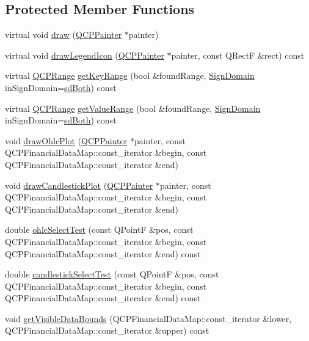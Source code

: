 \subsection*{Protected Member Functions}
\begin{DoxyCompactItemize}
\item 
virtual void \hyperlink{classQCPFinancial_ad71a59a1b42616594831e04e52c92120}{draw} (\hyperlink{classQCPPainter}{Q\+C\+P\+Painter} $\ast$painter)
\item 
virtual void \hyperlink{classQCPFinancial_aca85e8435b092cc8c3e5de65fcfb22c8}{draw\+Legend\+Icon} (\hyperlink{classQCPPainter}{Q\+C\+P\+Painter} $\ast$painter, const Q\+RectF \&rect) const 
\item 
virtual \hyperlink{classQCPRange}{Q\+C\+P\+Range} \hyperlink{classQCPFinancial_acc747f4a9b4fddfb14eb9d803349a534}{get\+Key\+Range} (bool \&found\+Range, \hyperlink{classQCPAbstractPlottable_a661743478a1d3c09d28ec2711d7653d8}{Sign\+Domain} in\+Sign\+Domain=\hyperlink{classQCPAbstractPlottable_a661743478a1d3c09d28ec2711d7653d8a082b98cfb91a7363a3b5cd17b0c1cd60}{sd\+Both}) const 
\item 
virtual \hyperlink{classQCPRange}{Q\+C\+P\+Range} \hyperlink{classQCPFinancial_ab2b5f3ef9a503ba32ead32081333f4e7}{get\+Value\+Range} (bool \&found\+Range, \hyperlink{classQCPAbstractPlottable_a661743478a1d3c09d28ec2711d7653d8}{Sign\+Domain} in\+Sign\+Domain=\hyperlink{classQCPAbstractPlottable_a661743478a1d3c09d28ec2711d7653d8a082b98cfb91a7363a3b5cd17b0c1cd60}{sd\+Both}) const 
\item 
void \hyperlink{classQCPFinancial_a3c3007a7434e29d042c77ccf4f497e66}{draw\+Ohlc\+Plot} (\hyperlink{classQCPPainter}{Q\+C\+P\+Painter} $\ast$painter, const Q\+C\+P\+Financial\+Data\+Map\+::const\+\_\+iterator \&begin, const Q\+C\+P\+Financial\+Data\+Map\+::const\+\_\+iterator \&end)
\item 
void \hyperlink{classQCPFinancial_a71f5081da0e5ab9c40a488ad40cff122}{draw\+Candlestick\+Plot} (\hyperlink{classQCPPainter}{Q\+C\+P\+Painter} $\ast$painter, const Q\+C\+P\+Financial\+Data\+Map\+::const\+\_\+iterator \&begin, const Q\+C\+P\+Financial\+Data\+Map\+::const\+\_\+iterator \&end)
\item 
double \hyperlink{classQCPFinancial_a9c7d79351e728a67bfb6821c1d1bd6c0}{ohlc\+Select\+Test} (const Q\+PointF \&pos, const Q\+C\+P\+Financial\+Data\+Map\+::const\+\_\+iterator \&begin, const Q\+C\+P\+Financial\+Data\+Map\+::const\+\_\+iterator \&end) const 
\item 
double \hyperlink{classQCPFinancial_abd0137244a17d5486a01ee442b083333}{candlestick\+Select\+Test} (const Q\+PointF \&pos, const Q\+C\+P\+Financial\+Data\+Map\+::const\+\_\+iterator \&begin, const Q\+C\+P\+Financial\+Data\+Map\+::const\+\_\+iterator \&end) const 
\item 
void \hyperlink{classQCPFinancial_aca2edf9f19fae733cdb6bd4549019b84}{get\+Visible\+Data\+Bounds} (Q\+C\+P\+Financial\+Data\+Map\+::const\+\_\+iterator \&lower, Q\+C\+P\+Financial\+Data\+Map\+::const\+\_\+iterator \&upper) const 
\end{DoxyCompactItemize}
